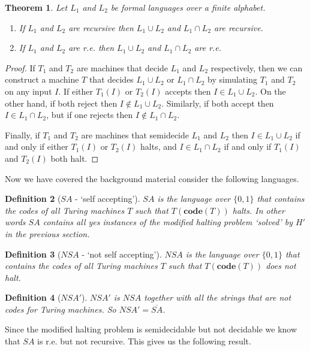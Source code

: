 \documentclass{article}
\theoremstyle{plain}
\newtheorem{theorem}{Theorem}[section]{\bfseries}{\itshape}
\newtheorem{definition}[theorem]{Definition}{\bfseries}{\upshape}
\theoremstyle{definition}
\newcommand{\co}{\mathbf{code}}
\begin{document}
\begin{theorem}
Let $L_1$ and $L_2$ be formal languages over a finite alphabet.
\begin{enumerate}
\item If $L_1$ and $L_2$ are recursive then $L_1\cup L_2$ and $L_1\cap L_2$ are recursive.
\item If $L_1$ and $L_2$ are r.e. then $L_1\cup L_2$ and $L_1\cap L_2$ are r.e.
\end{enumerate}
\end{theorem}
\begin{proof}
If $T_1$ and $T_2$ are machines that decide $L_1$ and $L_2$ respectively, then we can construct a machine $T$ that decides $L_1\cup L_2$ or $L_1\cap L_2$ by simulating $T_1$ and $T_2$ on any input $I$. If either $T_1(I)$ or $T_2(I)$ accepts then $I\in L_1\cup L_2$. On the other hand, if both reject then $I\notin L_1\cup L_2$. Similarly, if both accept then $I\in L_1\cap L_2$, but if one rejects then $I\notin L_1\cap L_2$.

Finally, if $T_1$ and $T_2$ are machines that semidecide $L_1$ and $L_2$ then $I\in L_1\cup L_2$ if and only if either $T_1(I)$ or $T_2(I)$ halts, and $I\in L_1\cap L_2$ if and only if $T_1(I)$ and $T_2(I)$ both halt. 
\end{proof}

Now we have covered the background material consider the following languages.

\begin{definition}[$SA$ - `self accepting']\label{D:SA}
$SA$ is the language over $\{0,1\}$ that contains the codes of all Turing machines $T$ such that $T(\co(T))$ halts. In other words $SA$ contains all yes instances of the modified halting problem `solved' by $H'$ in the previous section.
\end{definition}

\begin{definition}[$NSA$ - `not self accepting']\label{D:NSA}
$NSA$ is the language over $\{0,1\}$ that contains the codes of all Turing machines $T$ such that $T(\co(T))$ does not halt.
\end{definition}

\begin{definition}[$NSA'$]
$NSA'$ is $NSA$ together with all the strings that are not codes for Turing machines. So $NSA'=\overline{SA}$.
\end{definition}


Since the modified halting problem is semidecidable but not decidable we know that $SA$ is r.e. but not recursive. This gives us the following result.
\end{document}
